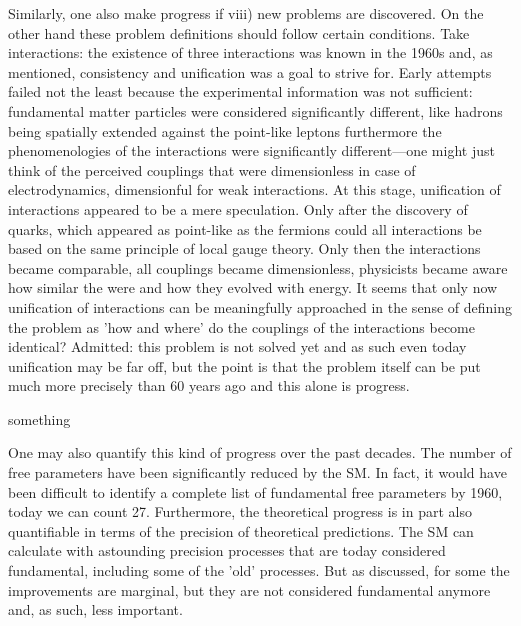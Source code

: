 Similarly, one also make progress if viii) new problems are discovered. 
On the other hand these problem definitions should follow certain conditions.
Take interactions: the existence of three interactions was known in the 1960s and, as mentioned, consistency and unification was a goal to strive for.
Early attempts failed not the least because the experimental information was not sufficient: fundamental matter particles were considered significantly different, like hadrons being spatially extended against the point-like leptons furthermore the phenomenologies of the interactions were significantly different---one might just think of the perceived couplings that were dimensionless in case of electrodynamics, dimensionful for weak interactions.
At this stage, unification of interactions appeared to be a mere speculation.
Only after the discovery of quarks, which appeared as point-like as the fermions could all interactions be based on the same principle of local gauge theory.
Only then the interactions became comparable, all couplings became dimensionless, physicists became aware how similar the were and how they evolved with energy. 
It seems that only now unification of interactions can be meaningfully approached in the sense of defining the problem as 'how and where' do the couplings of the interactions become identical? Admitted: this problem is not solved yet and as such even today unification may be far off, but the point is that the problem itself can be put much more precisely than 60 years ago and this alone is progress.

something

One may also quantify this kind of progress over the past decades.
The number of free parameters have been significantly reduced by the SM.
In fact, it would have been difficult to identify a complete list of fundamental free parameters by 1960, today we can count 27.
Furthermore, the theoretical progress is in part also quantifiable in terms of the precision of theoretical predictions.
The SM can calculate with astounding precision processes that are today considered fundamental, including some of the 'old' processes.  
But as discussed, for some the improvements are marginal, but they are not considered fundamental anymore and, as such, less important.